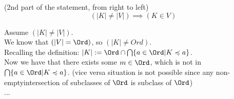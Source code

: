 \begin{lemma}(2nd part of the statement, from right to left)
\[
(|K| \neq |V|) \implies (K \in V)
\]
\end{lemma}
\Proof
Assume $(|K| \neq |V|)$.\\
We know that $(|V|=\Ord)$, so $(|K| \neq Ord)$.\\
Recalling the definition:
$|K|:= \Ord \cap \bigcap \{a\in\Ord|K\preccurlyeq a\}$.\\
Now we have that 
there exists some $m \in \Ord$, which is not in $\bigcap \{a\in\Ord|K\preccurlyeq a\}$. (vice versa situation is not possible since any non-emptyintersection of subclasses of $\Ord$ is subclass of $\Ord$)\\
...

\Done

